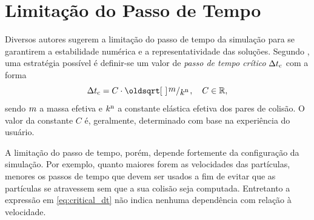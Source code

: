 




\section{Limitação do Passo de Tempo}

Diversos autores sugerem a limitação do passo de tempo da simulação para se garantirem a estabilidade numérica e a representatividade das soluções. Segundo , uma estratégia possível é definir-se um valor de \textit{passo de tempo crítico} \(\Delta t_{\text{c}}\) com a forma
\begin{equation} \label{eq:critical_dt}
	\criticalDt = C\cdot\sqrt{\bigslant{\mass}{\effectiveNormalElastic}},\quad C\in\real,
\end{equation}
sendo \(m\) a massa efetiva e \(k^{\text{n}}\) a constante elástica efetiva dos pares de colisão. O valor da constante \(C\) é, geralmente, determinado com base na experiência do usuário.

A limitação do passo de tempo, porém, depende fortemente da configuração da simulação. Por exemplo, quanto maiores forem as velocidades das partículas, menores os passos de tempo que devem ser usados a fim de evitar que as partículas se atravessem sem que a sua colisão seja computada. Entretanto a expressão em \eqref{eq:critical_dt} não indica nenhuma dependência com relação à velocidade.

